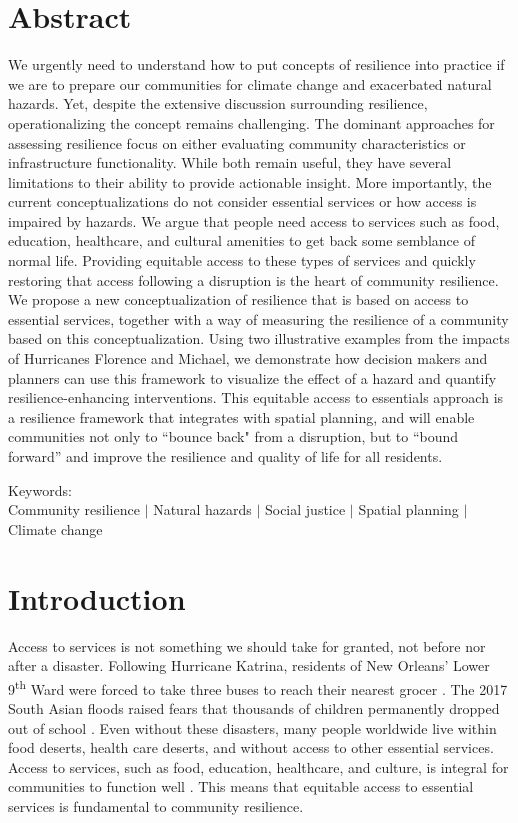 \documentclass[onecolumn,doublespacing]{risa}
\let \cite \parencite
\begin{document}
\maketitle
\newpage

\section*{Abstract}
We urgently need to understand how to put concepts of resilience into practice if we are to prepare our communities for climate change and exacerbated natural hazards.
Yet, despite the extensive discussion surrounding resilience, operationalizing the concept remains challenging. 
The dominant approaches for assessing resilience focus on either evaluating community characteristics or infrastructure functionality. 
While both remain useful, they have several limitations to their ability to provide actionable insight.
More importantly, the current conceptualizations do not consider essential services or how access is impaired by hazards. 
We argue that people need access to services such as food, education, healthcare, and cultural amenities to get back some semblance of normal life.
Providing equitable access to these types of services and quickly restoring that access following a disruption is the heart of community resilience. 
We propose a new conceptualization of resilience that is based on access to essential services, together with a way of measuring the resilience of a community based on this conceptualization. 
Using two illustrative examples from the impacts of Hurricanes Florence and Michael, we demonstrate how decision makers and planners can use this framework to visualize the effect of a hazard and quantify resilience-enhancing interventions. 
This equitable access to essentials approach is a resilience framework that integrates with spatial planning, and will enable communities not only to ``bounce back" from a disruption, but to ``bound forward'' and improve the resilience and quality of life for all residents.

Keywords:\\
Community resilience $|$ Natural hazards $|$ Social justice $|$ Spatial planning $|$ Climate change
\newpage

\section{Introduction}
Access to services is not something we should take for granted, not before nor after a disaster. Following Hurricane Katrina, residents of New Orleans' Lower 9\textsuperscript{th} Ward were forced to take three buses to reach their nearest grocer \cite{Netter2016-dm}. 
The 2017 South Asian floods raised fears that thousands of children permanently dropped out of school \cite{Watt2017-bs}. 
Even without these disasters, many people worldwide live within food deserts, health care deserts, and without access to other essential services. 
Access to services, such as food, education, healthcare, and culture, is integral for communities to function well \cite{Winter1997-kc, Logan2017-fr, Dempsey2011-og, United_Nations_Educational_Scientific_and_Cultural_Organization2018-sf}.
This means that equitable access to essential services is fundamental to community resilience.
\end{document}
